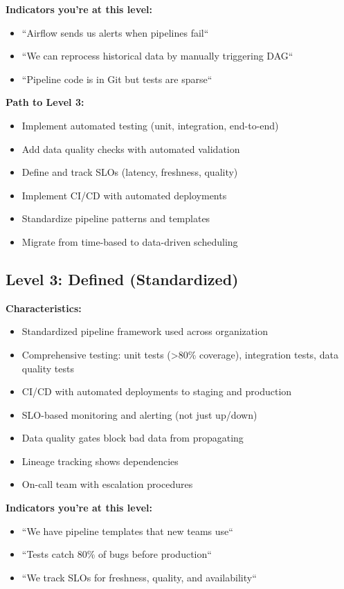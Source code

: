 \textbf{Indicators you're at this level:}
\begin{itemize}
    \item ``Airflow sends us alerts when pipelines fail``
    \item ``We can reprocess historical data by manually triggering DAG``
    \item ``Pipeline code is in Git but tests are sparse``
\end{itemize}

\textbf{Path to Level 3:}
\begin{itemize}
    \item Implement automated testing (unit, integration, end-to-end)
    \item Add data quality checks with automated validation
    \item Define and track SLOs (latency, freshness, quality)
    \item Implement CI/CD with automated deployments
    \item Standardize pipeline patterns and templates
    \item Migrate from time-based to data-driven scheduling
\end{itemize}

\subsection{Level 3: Defined (Standardized)}

\textbf{Characteristics:}
\begin{itemize}
    \item Standardized pipeline framework used across organization
    \item Comprehensive testing: unit tests (>80\% coverage), integration tests, data quality tests
    \item CI/CD with automated deployments to staging and production
    \item SLO-based monitoring and alerting (not just up/down)
    \item Data quality gates block bad data from propagating
    \item Lineage tracking shows dependencies
    \item On-call team with escalation procedures
\end{itemize}

\textbf{Indicators you're at this level:}
\begin{itemize}
    \item ``We have pipeline templates that new teams use``
    \item ``Tests catch 80\% of bugs before production``
    \item ``We track SLOs for freshness, quality, and availability``
\end{itemize}

